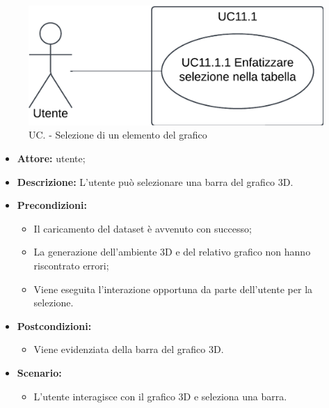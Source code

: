 \pagebreak

\begin{figure}[h!]\centering
    \includegraphics[scale=0.7]{template/images/UC11.1.png}
    \caption{UC. - Selezione di un elemento del grafico}
\end{figure}
\begin{itemize}    
    \item \textbf{Attore:} utente;
    \item \textbf{Descrizione:} L'utente può selezionare una barra del grafico 3D.
    \item \textbf{Precondizioni:}    
        \begin{itemize}
            \item Il caricamento del dataset è avvenuto con successo;
            \item La generazione dell'ambiente 3D e del relativo grafico non hanno riscontrato errori;
            \item Viene eseguita l'interazione opportuna da parte dell'utente per la selezione.
        \end{itemize}    
    \item \textbf{Postcondizioni:}
        \begin{itemize}
            \item Viene evidenziata della barra del grafico 3D.
        \end{itemize}    
    \item \textbf{Scenario:} 
        \begin{itemize}
            \item L'utente interagisce con il grafico 3D e seleziona una barra.
        \end{itemize}
\end{itemize}
